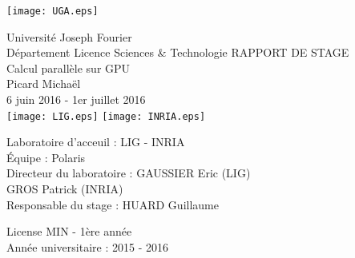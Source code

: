 \documentclass[a4paper,12pt]{article}
\begin{document}
	\begin{flushright}
		\texttt{[image: UGA.eps]}
	\end{flushright}
	\vspace{1.5cm}
	\begin{center}
		{\Large Universit\'e{} Joseph Fourier\\
		D\'e{}partement Licence Sciences \& Technologie}
		\vspace{1cm}
		{\Huge RAPPORT DE STAGE}\\
		\vspace{3mm}
		{\Large Calcul parall\`ele sur GPU}\\
		\vspace{2mm}
		Picard Micha\"el\\
		6 juin 2016 - 1er juillet 2016\\
		\vspace{4mm}
		\texttt{[image: LIG.eps]}
		\texttt{[image: INRIA.eps]}
	\end{center}
	\vspace{1cm}
	\begin{flushleft}
		Laboratoire d'acceuil : LIG - INRIA\\
		\'E{}quipe : Polaris\\
		Directeur du laboratoire : GAUSSIER Eric (LIG)\\
		\hspace{4.65cm} GROS Patrick (INRIA)\\
		Responsable du stage : HUARD Guillaume
	\end{flushleft}
	\vspace{8mm}
	\begin{flushright}
	License MIN - 1\`ere ann\'e{}e\\
	Ann\'e{}e universitaire : 2015 - 2016
	\end{flushright}
	
\end{document}
